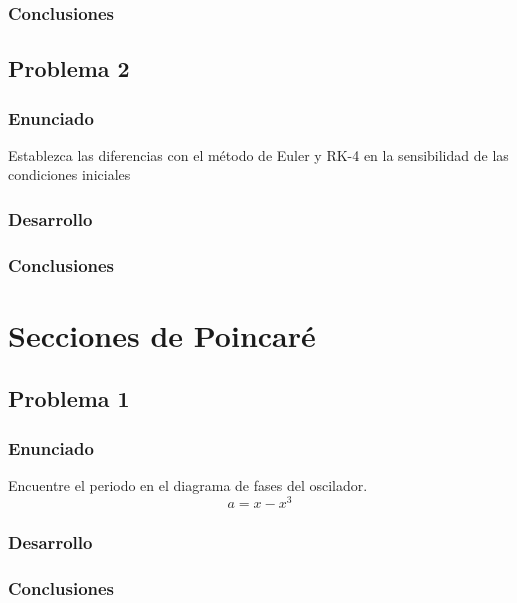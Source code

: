 \documentclass[a4paper,12pt]{article}
\theoremstyle{mytheor}
\begin{document}
\subsubsection{Conclusiones}

\subsection{Problema 2}
\subsubsection{Enunciado}
Establezca las diferencias con el método de Euler y RK-4 en la sensibilidad de las condiciones
iniciales

\subsubsection{Desarrollo}

\subsubsection{Conclusiones}


\newpage

\section{Secciones de Poincaré}

\subsection{Problema 1}
\subsubsection{Enunciado}
Encuentre el periodo en el diagrama de fases del oscilador.
\begin{equation}
a = x - x^3
\end{equation}

\subsubsection{Desarrollo}

\subsubsection{Conclusiones}
\end{document}
